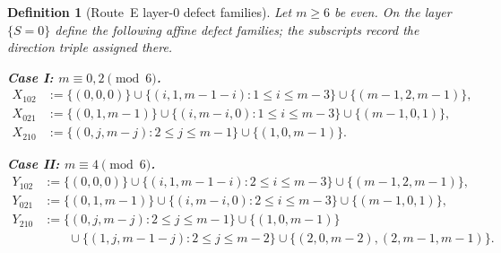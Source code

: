 \documentclass[11pt]{article}
\newtheorem{definition}{Definition}
\begin{document}
\begin{definition}[Route~E layer-$0$ defect families]\label{def:routeE-layer0-families}
Let $m\ge 6$ be even.
On the layer $\{S=0\}$ define the following affine defect families; the subscripts record the direction triple assigned there.

\smallskip
\noindent\textbf{Case I: $m\equiv 0,2\pmod 6$.}
\begin{align*}
X_{102}&:=\{(0,0,0)\}\cup\{(i,1,m-1-i):1\le i\le m-3\}\cup\{(m-1,2,m-1)\},\\
X_{021}&:=\{(0,1,m-1)\}\cup\{(i,m-i,0):1\le i\le m-3\}\cup\{(m-1,0,1)\},\\
X_{210}&:=\{(0,j,m-j):2\le j\le m-1\}\cup\{(1,0,m-1)\}.
\end{align*}

\smallskip
\noindent\textbf{Case II: $m\equiv 4\pmod 6$.}
\begin{align*}
Y_{102}&:=\{(0,0,0)\}\cup\{(i,1,m-1-i):2\le i\le m-3\}\cup\{(m-1,2,m-1)\},\\
Y_{021}&:=\{(0,1,m-1)\}\cup\{(i,m-i,0):2\le i\le m-3\}\cup\{(m-1,0,1)\},\\
Y_{210}&:=\{(0,j,m-j):2\le j\le m-1\}\cup\{(1,0,m-1)\}\\
&\hspace{2em}\cup\{(1,j,m-1-j):2\le j\le m-2\}\cup\{(2,0,m-2),(2,m-1,m-1)\}.
\end{align*}
\end{definition}
\end{document}
